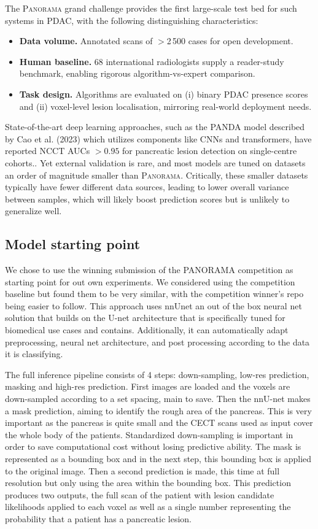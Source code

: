 \documentclass[conference]{IEEEtran}
\begin{document}
The \textsc{Panorama} grand challenge provides the first large-scale test bed for such systems in PDAC, with the following distinguishing characteristics:  
\begin{itemize}[leftmargin=*]
  \item \textbf{Data volume.}  Annotated scans of $>$2\,500 cases for open development.
  \item \textbf{Human baseline.} 68 international radiologists supply a reader-study benchmark, enabling rigorous algorithm-vs-expert comparison.
  \item \textbf{Task design.}  Algorithms are evaluated on (i) binary PDAC presence scores and (ii) voxel-level lesion localisation, mirroring real-world deployment needs.
\end{itemize}

State-of-the-art deep learning approaches, such as the PANDA model described by Cao et al. (2023) which utilizes components like CNNs and transformers, have reported NCCT AUCs $>0.95$ for pancreatic lesion detection on single-centre cohorts.\cite{Cao2023,PANDA2023}. Yet external validation is rare, and most models are tuned on datasets an order of magnitude smaller than \textsc{Panorama}. Critically, these smaller datasets typically have fewer different data sources, leading to lower overall variance between samples, which will likely boost prediction scores but is unlikely to generalize well.

\subsection{Model starting point}
We chose to use the winning submission of the PANORAMA competition as starting point for out own experiments. We considered using the competition baseline but found them to be very similar, with the competition winner's repo being easier to follow. This approach uses nnUnet \cite{b1} an out of the box neural net solution that builds on the U-net architecture that is specifically tuned for biomedical use cases and contains. Additionally, it can automatically adapt preprocessing, neural net architecture, and post processing according to the data it is classifying.

The full inference pipeline consists of 4 steps: down-sampling, low-res prediction, masking and high-res prediction. First images are loaded and the voxels are down-sampled according to a set spacing, main to save. Then the nnU-net makes a mask prediction, aiming to identify the rough area of the pancreas. This is very important as the pancreas is quite small and the CECT scans used as input cover the whole body of the patients. Standardized down-sampling is important in order to save computational cost without losing predictive ability. The mask is represented as a bounding box and in the next step, this bounding box is applied to the original image. Then a second prediction is made, this time at full resolution but only using the area within the bounding box. This prediction produces two outputs, the full scan of the patient with lesion candidate likelihoods applied to each voxel as well as a single number representing the probability that a patient has a pancreatic lesion.
\end{document}
